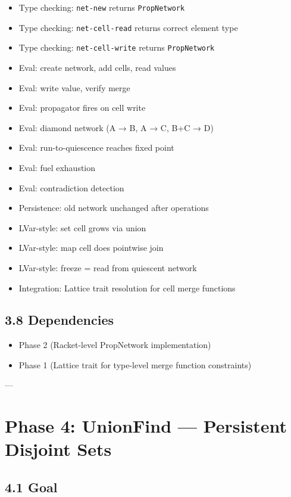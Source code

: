 \documentclass[11pt]{article}
\begin{document}
\begin{itemize}
\item Type checking: \texttt{net-new} returns \texttt{PropNetwork}
\item Type checking: \texttt{net-cell-read} returns correct element type
\item Type checking: \texttt{net-cell-write} returns \texttt{PropNetwork}
\item Eval: create network, add cells, read values
\item Eval: write value, verify merge
\item Eval: propagator fires on cell write
\item Eval: diamond network (A → B, A → C, B+C → D)
\item Eval: run-to-quiescence reaches fixed point
\item Eval: fuel exhaustion
\item Eval: contradiction detection
\item Persistence: old network unchanged after operations
\item LVar-style: set cell grows via union
\item LVar-style: map cell does pointwise join
\item LVar-style: freeze = read from quiescent network
\item Integration: Lattice trait resolution for cell merge functions
\end{itemize}
\subsection{3.8 Dependencies}
\label{sec:org71c1244}

\begin{itemize}
\item Phase 2 (Racket-level PropNetwork implementation)
\item Phase 1 (Lattice trait for type-level merge function constraints)
\end{itemize}

---
\section{Phase 4: UnionFind — Persistent Disjoint Sets}
\label{sec:org0c4e7c1}

\subsection{4.1 Goal}
\label{sec:org5579cc8}
\end{document}

